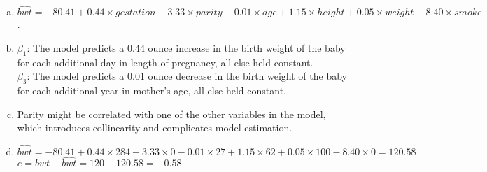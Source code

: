 {
\begin{enumerate}[(a)]
\setlength{\itemsep}{0mm}
\item $\widehat{bwt} = -80.41 + 0.44 \times gestation - 3.33 \times parity - 0.01 \times age + 1.15 \times height + 0.05 \times weight - 8.40 \times smoke$.
\item $\beta_1$: The model predicts a 0.44 ounce increase in the birth weight of the baby for each additional day in length of pregnancy, all else held constant. \\
$\beta_3$: The model predicts a 0.01 ounce decrease in the birth weight of the baby for each additional year in mother's age, all else held constant. 
\item Parity might be correlated with one of the other variables in the model, which introduces collinearity and complicates model estimation.
\item $\widehat{bwt} = -80.41 + 0.44 \times 284 - 3.33 \times 0 - 0.01 \times 27 + 1.15 \times 62 + 0.05 \times 100 - 8.40 \times 0 = 120.58$ \\
$e = bwt - \widehat{bwt} = 120 - 120.58 = -0.58$
\end{enumerate}
}\label{babiesMR}


